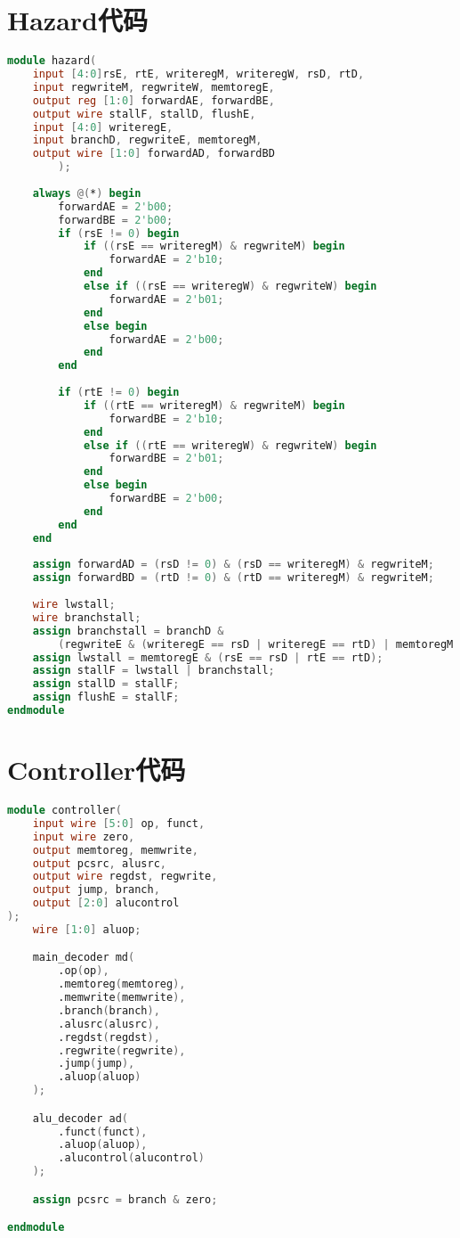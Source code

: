 \section{Hazard代码}
\begin{lstlisting}[language=Verilog]
module hazard(
    input [4:0]rsE, rtE, writeregM, writeregW, rsD, rtD,
    input regwriteM, regwriteW, memtoregE,
    output reg [1:0] forwardAE, forwardBE,
    output wire stallF, stallD, flushE,
    input [4:0] writeregE,
    input branchD, regwriteE, memtoregM,
    output wire [1:0] forwardAD, forwardBD
        );
    
    always @(*) begin
        forwardAE = 2'b00;
        forwardBE = 2'b00;
        if (rsE != 0) begin 
            if ((rsE == writeregM) & regwriteM) begin
                forwardAE = 2'b10;
            end
            else if ((rsE == writeregW) & regwriteW) begin
                forwardAE = 2'b01;
            end
            else begin
                forwardAE = 2'b00;
            end
        end
    
        if (rtE != 0) begin
            if ((rtE == writeregM) & regwriteM) begin
                forwardBE = 2'b10;
            end
            else if ((rtE == writeregW) & regwriteW) begin
                forwardBE = 2'b01;
            end
            else begin
                forwardBE = 2'b00;
            end
        end
    end
    
    assign forwardAD = (rsD != 0) & (rsD == writeregM) & regwriteM;
    assign forwardBD = (rtD != 0) & (rtD == writeregM) & regwriteM;
    
    wire lwstall;
    wire branchstall;
    assign branchstall = branchD &
        (regwriteE & (writeregE == rsD | writeregE == rtD) | memtoregM & (writeregM == rsD | writeregM == rtD));
    assign lwstall = memtoregE & (rsE == rsD | rtE == rtD);
    assign stallF = lwstall | branchstall;
    assign stallD = stallF;
    assign flushE = stallF;
endmodule
\end{lstlisting}

\section{Controller代码}
\begin{lstlisting}[language=Verilog]
module controller(
    input wire [5:0] op, funct,
    input wire zero,
    output memtoreg, memwrite,
    output pcsrc, alusrc,
    output wire regdst, regwrite,
    output jump, branch,
    output [2:0] alucontrol
);
    wire [1:0] aluop;

    main_decoder md(
        .op(op),
        .memtoreg(memtoreg),
        .memwrite(memwrite),
        .branch(branch),
        .alusrc(alusrc),
        .regdst(regdst),
        .regwrite(regwrite),
        .jump(jump),
        .aluop(aluop)
    );

    alu_decoder ad(
        .funct(funct),
        .aluop(aluop),
        .alucontrol(alucontrol)
    );

    assign pcsrc = branch & zero;

endmodule
\end{lstlisting}